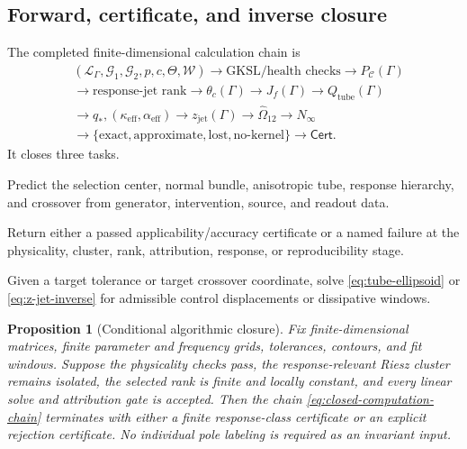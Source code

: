 \documentclass[11pt]{article}
\newtheorem{proposition}[theorem]{Proposition}
\theoremstyle{definition}
\theoremstyle{remark}
\newcommand{\cL}{\mathcal L}
\newcommand{\cG}{\mathcal G}
\newcommand{\cC}{\mathcal C}
\begin{document}
\subsection{Forward, certificate, and inverse closure}

The completed finite-dimensional calculation chain is
\begin{equation}
\boxed{
\begin{aligned}
 &(\cL_\Gamma,\cG_1,\cG_2,p,c,\Theta,\mathcal W)
 \longrightarrow \text{GKSL/health checks}
 \longrightarrow P_{\cC}(\Gamma)\\
 &\longrightarrow \text{response-jet rank}
 \longrightarrow \theta_c(\Gamma)
 \longrightarrow J_f(\Gamma)
 \longrightarrow Q_{\mathrm{tube}}(\Gamma)\\
 &\longrightarrow q_*,(\kappa_{\mathrm{eff}},\alpha_{\mathrm{eff}})
 \longrightarrow z_{\mathrm{jet}}(\Gamma)
 \longrightarrow \widehat\Omega_{12}
 \longrightarrow N_\infty\\
 &\longrightarrow
 \{\text{exact},\text{approximate},\text{lost},\text{no-kernel}\}
 \longrightarrow \mathsf{Cert}.
\end{aligned}}
\label{eq:closed-computation-chain}
\end{equation}
It closes three tasks.
\begin{description}[leftmargin=7em,style=nextline]
 \item[Forward.] Predict the selection center, normal bundle, anisotropic tube, response hierarchy, and crossover from generator, intervention, source, and readout data.
 \item[Certificate.] Return either a passed applicability/accuracy certificate or a named failure at the physicality, cluster, rank, attribution, response, or reproducibility stage.
 \item[Inverse.] Given a target tolerance or target crossover coordinate, solve \eqref{eq:tube-ellipsoid} or \eqref{eq:z-jet-inverse} for admissible control displacements or dissipative windows.
\end{description}

\begin{proposition}[Conditional algorithmic closure]\label{prop:algorithmic-closure}
Fix finite-dimensional matrices, finite parameter and frequency grids, tolerances, contours, and fit windows.  Suppose the physicality checks pass, the response-relevant Riesz cluster remains isolated, the selected rank is finite and locally constant, and every linear solve and attribution gate is accepted.  Then the chain \eqref{eq:closed-computation-chain} terminates with either a finite response-class certificate or an explicit rejection certificate.  No individual pole labeling is required as an invariant input.
\end{proposition}
\end{document}
